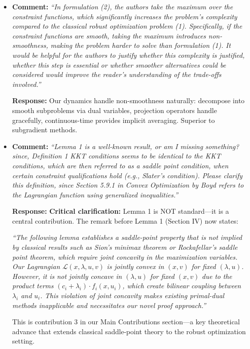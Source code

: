 \documentclass[journal,twoside,web]{ieeecolor}
\begin{document}
\begin{itemize}
\item  \textbf{Comment:} \textit{``In formulation (2), the authors take the maximum over the constraint functions, which significantly increases the problem's complexity compared to the classical robust optimization problem (1). Specifically, if the constraint functions are smooth, taking the maximum introduces non-smoothness, making the problem harder to solve than formulation (1). It would be helpful for the authors to justify whether this complexity is justified, whether this step is essential or whether smoother alternatives could be considered would improve the reader's understanding of the trade-offs involved.''}

\textbf{Response:} Our dynamics handle non-smoothness naturally: decompose into smooth subproblems via dual variables, projection operators handle gracefully, continuous-time provides implicit averaging. Superior to subgradient methods.

\item  \textbf{Comment:} \textit{``Lemma 1 is a well-known result, or am I missing something? since, Definition 1 KKT conditions seems to be identical to the KKT conditions, which are then referred to as a saddle point condition, when certain constraint qualifications hold (e.g., Slater's condition). Please clarify this definition, since Section 5.9.1 in Convex Optimization by Boyd refers to the Lagrangian function using generalized inequalities.''}

\textbf{Response:} \textbf{Critical clarification:} Lemma 1 is NOT standard—it is a central contribution. The remark before Lemma 1 (Section IV) now states: 

{\color{revisionblue}\textit{``The following lemma establishes a saddle-point property that is not implied by classical results such as Sion's minimax theorem or Rockafellar's saddle point theorem, which require joint concavity in the maximization variables. Our Lagrangian $\mathcal{L}(x,\lambda,u,v)$ is jointly convex in $(x,v)$ for fixed $(\lambda,u)$. However, it is not jointly concave in $(\lambda,u)$ for fixed $(x,v)$ due to the product terms $(c_i+\lambda_i) \cdot f_i(x,u_i)$, which create bilinear coupling between $\lambda_i$ and $u_i$. This violation of joint concavity makes existing primal-dual methods inapplicable and necessitates our novel proof approach.''}}

This is contribution 3 in our Main Contributions section—a key theoretical advance that extends classical saddle-point theory to the robust optimization setting.\\


\end{itemize}
\end{document}
